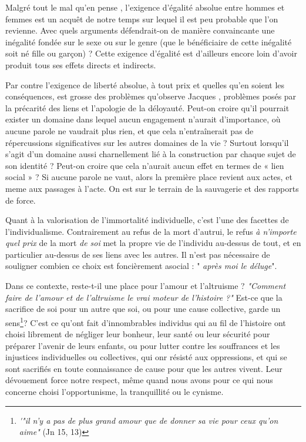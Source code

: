  Malgré tout le mal qu'en pense , l'exigence d'égalité absolue entre hommes et femmes est un acquêt de notre temps sur lequel il est peu probable que l'on revienne. Avec quels arguments défendrait-on de manière convaincante une inégalité fondée sur le sexe ou sur le genre (que le bénéficiaire de cette inégalité soit né fille ou garçon) ? Cette exigence d'égalité est d'ailleurs encore loin d'avoir produit tous ses effets directs et indirects.
 
 Par contre l'exigence de liberté absolue, à tout prix et quelles qu'en soient les conséquences, est grosse des problèmes  qu'observe Jacques , problèmes posés par la précarité des liens et l'apologie de la déloyauté. Peut-on croire qu'il pourrait exister un domaine  dans lequel aucun engagement n'aurait d'importance, où aucune parole ne vaudrait plus rien, et que cela n'entraînerait pas de répercussions significatives sur les autres domaines de la vie ? Surtout lorsqu'il s'agit d'un domaine aussi charnellement lié à la construction par chaque sujet de son identité ? Peut-on croire que cela n'aurait aucun effet en termes de « lien social » ? Si aucune parole ne vaut, alors la première place revient aux actes, et meme aux passages à l'acte. On est sur le terrain de la sauvagerie et des rapports de force.
 
 Quant à la valorisation de l'immortalité individuelle, c'est l'une des facettes de l'individualisme. Contrairement au refus de la mort d'autrui, le refus \emph{à n'importe quel prix} de la mort \emph{de soi} met la propre vie de l'individu au-dessus de tout, et en particulier au-dessus de ses liens avec les autres. Il n'est pas nécessaire de souligner combien ce choix est foncièrement asocial : "\emph{ après moi le déluge}". 

 Dans ce contexte, reste-t-il une place pour l'amour et l'altruisme ? \emph{"Comment faire de l'amour et de l'altruisme le vrai moteur de l'histoire ?"} Est-ce que la sacrifice de soi pour un autre que soi, ou pour une cause collective, garde un sens\footnote{\emph '\emph{"il n'y a pas de plus grand amour que de donner sa vie pour ceux qu'on aime"} (Jn 15, 13)}?  C'est ce qu'ont fait d'innombrables individus qui au fil de l'histoire ont choisi librement de négliger leur bonheur, leur santé ou leur sécurité pour préparer l'avenir de leurs enfants, ou pour lutter contre les souffrances et les injustices individuelles ou collectives, qui onr résisté aux oppressions, et qui se sont sacrifiés en toute connaissance de cause pour que les autres vivent. Leur dévouement force notre respect, même quand nous avons pour ce qui nous concerne choisi l'opportunisme, la tranquillité ou le cynisme. 
 
